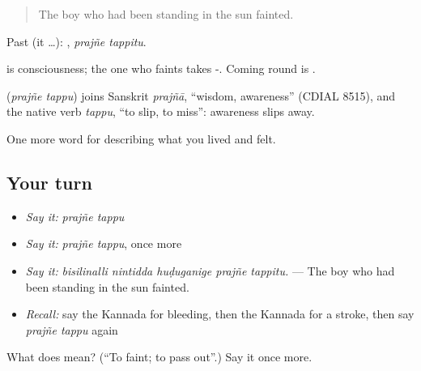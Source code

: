 \begin{quote}
The boy who had been standing in the sun fainted.
\end{quote}

Past (it …):  , \emph{prajñe tappitu}.

 is consciousness; the one who faints takes -. Coming round is  .

\begin{cousinweb}
\textbf{ } (\emph{prajñe tappu}) joins Sanskrit \emph{prajñā}, \textquotedblleft{}wisdom, awareness\textquotedblright{} (CDIAL 8515), and the native verb \emph{tappu}, \textquotedblleft{}to slip, to miss\textquotedblright{}: awareness slips away.
\end{cousinweb}

\begin{grammarlens}[title={What you've built}]
One more word for describing what you lived and felt.
\end{grammarlens}

\subsection*{Your turn}
\begin{itemize}
\raggedright
  \item \emph{Say it:} \emph{prajñe tappu}
  \item \emph{Say it:} \emph{prajñe tappu}, once more
  \item \emph{Say it:} \emph{bisilinalli nintidda huḍuganige prajñe tappitu.} — The boy who had been standing in the sun fainted.
  \item \emph{Recall:} say the Kannada for bleeding, then the Kannada for a stroke, then say \emph{prajñe tappu} again
\end{itemize}

\begin{tcolorbox}[breakable,colback=teal!4,colframe=teal!35!black,title={Before you move on}]
What does   mean? (\textquotedblleft{}To faint; to pass out\textquotedblright{}.) Say it once more.
\end{tcolorbox}
